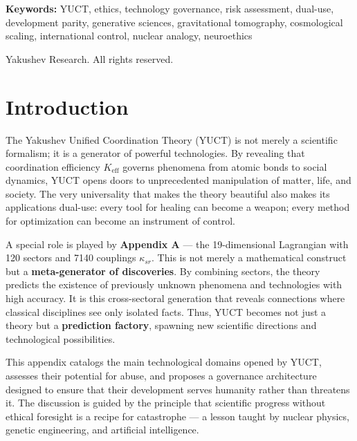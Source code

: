 \documentclass[12pt,a4paper]{article}
\theoremstyle{remark}
\newcommand{\Keff}{K_{\mathrm{eff}}}
\begin{document}
\begin{titlepage}
\begin{center}
			\vspace{1cm}
			
			\noindent
			\small\textbf{Keywords:} YUCT, ethics, technology governance, risk assessment, dual-use, development parity, generative sciences, gravitational tomography, cosmological scaling, international control, nuclear analogy, neuroethics
			
			\vspace{0.5cm}
			
			\noindent
			 Yakushev Research. All rights reserved.
		\end{center}
	\end{titlepage}
	
	\tableofcontents
	\newpage
	
	\section{Introduction}
	\label{sec:intro}
	
	The Yakushev Unified Coordination Theory (YUCT) is not merely a scientific formalism; it is a generator of powerful technologies. By revealing that coordination efficiency \(\Keff\) governs phenomena from atomic bonds to social dynamics, YUCT opens doors to unprecedented manipulation of matter, life, and society. The very universality that makes the theory beautiful also makes its applications dual-use: every tool for healing can become a weapon; every method for optimization can become an instrument of control.
	
	A special role is played by \textbf{Appendix A} — the 19-dimensional Lagrangian with 120 sectors and 7140 couplings \(\kappa_{sr}\). This is not merely a mathematical construct but a \textbf{meta-generator of discoveries}. By combining sectors, the theory predicts the existence of previously unknown phenomena and technologies with high accuracy. It is this cross-sectoral generation that reveals connections where classical disciplines see only isolated facts. Thus, YUCT becomes not just a theory but a \textbf{prediction factory}, spawning new scientific directions and technological possibilities.
	
	This appendix catalogs the main technological domains opened by YUCT, assesses their potential for abuse, and proposes a governance architecture designed to ensure that their development serves humanity rather than threatens it. The discussion is guided by the principle that scientific progress without ethical foresight is a recipe for catastrophe — a lesson taught by nuclear physics, genetic engineering, and artificial intelligence.
	
\end{document}
